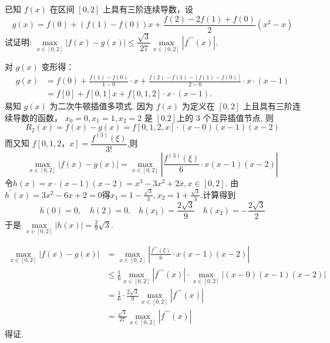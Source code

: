   \begin{tcolorbox}[enhanced,colback=10,colframe=9,breakable,coltitle=green!25!black,title=2024]
  
已知 $ f(x) $ 在区间 $ [0,2] $ 上具有三阶连续导数，设
$$
g(x)=f(0)+(f(1)-f(0)) x+\frac{f(2)-2 f(1)+f(0)}{2}\left(x^{2}-x\right)
$$
试证明: $ \max\limits _{x \in[0,2]}|f(x)-g(x)| \leq \dfrac{\sqrt{3}}{27} \max\limits _{x \in[0,2]}\left|f^{\prime \prime \prime}(x)\right| $.
 \tcblower

对 $ g(x) $ 变形得：
$$
\begin{aligned}
g(x) & =f(0)+\frac{f(1)-f(0)}{1-0} \cdot x+\frac{f(2)-f(1)-[f(1)-f(0)]}{2-0} \cdot x \cdot(x-1) \\
& =f[0]+f[0,1] x+f[0,1,2] \cdot x \cdot(x-1) .
\end{aligned}
$$
易知 $ g(x) $ 为二次牛顿插值多项式. 因为 $ f(x) $ 为定义在 $ [0,2] $ 上且具有三阶连续导数的函数， $ x_{0}=0 , x_{1}=1 , x_{2}=2 $ 是 $[0.2]$上的 $3$ 个互异插值节点,
则 
$$
R_{2}(x)=f(x)-g(x)=f[0,1,2,x] \cdot(x-0)(x-1)(x-2)
$$
而又知 $ f[0,1,2，x]=\dfrac{f^{(3)}(\xi)}{3 !} $,则 
$$ \max _{x \in[0,2]}|f(x)-g(x)|=\max _{x \in[0,2]}\left|\frac{f^{(3)}(\xi)}{6} \cdot x(x-1)(x-2)\right| $$
令$h(x)=x \cdot(x-1)(x-2)=x^{3}-3 x^{2}+2 x,x \in[0,2]$.
由$ h^{\prime}(x)=3 x^{2}-6 x+2=0 $得$ x_{1}=1-\frac{\sqrt{3}}{3}, x_{2}=1+\frac{\sqrt{3}}{3} $.计算得到
$$
h(0)=0, \quad h(2)=0 . \quad h\left(x_{1}\right)=\frac{2 \sqrt{3}}{9} \quad h\left(x_{2}\right)=-\frac{2 \sqrt{3}}{2}
$$
于是 $ \max\limits _{x \in[0, 2]}|h(x)|=\frac{2}{9} \sqrt{3} $.


$$
\begin{aligned}
\max _{x \in[0,2]}|f(x)-g(x)|&=\max _{x \in[0,2]}\left|\frac{f^{\prime \prime \prime}(\xi)}{6} \cdot x(x-1)(x-2)\right|  \\
&\leqslant \frac{1}{6} \max _{x \in[0,2]}\left|f^{\prime \prime \prime}(x)\right| \cdot \max _{x \in[0,2]}\left|\left(x-{0}\right)\left(x-{1}\right)\left(x-{2}\right)\right| \\
&=\frac{1}{6} \cdot\frac{2 \sqrt{3}}{9} \max _{x \in[0,2]}\left|f^{\prime \prime \prime}(x)\right|\\&=\frac{\sqrt{3}}{27}   \max _{x \in[0,2]}\left|f^{\prime \prime \prime}(x)\right|
\end{aligned}
$$
得证.

\end{tcolorbox}


